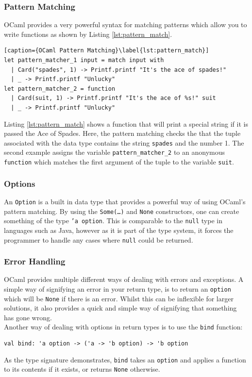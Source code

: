 \documentclass[12pt,a4paper,twoside,openright]{report}
\begin{document}
	\subsubsection*{Pattern Matching}
	OCaml provides a very powerful syntax for matching patterns which allow you to write functions as shown by Listing \ref{lst:pattern_match}.
	\begin{lstlisting}[caption={OCaml Pattern Matching}\label{lst:pattern_match}]
let pattern_matcher_1 input = match input with
  | Card("spades", 1) -> Printf.printf "It's the ace of spades!"
  | _ -> Printf.printf "Unlucky"
let pattern_matcher_2 = function
  | Card(suit, 1) -> Printf.printf "It's the ace of %s!" suit
  | _ -> Printf.printf "Unlucky"
	\end{lstlisting}
	Listing \ref{lst:pattern_match} shows a function that will print a special string if it is passed the Ace of Spades. 
	Here, the pattern matching checks the that the tuple associated with the data type contains the string \texttt{spades} and the number 1.
	The second example assigns the variable \texttt{pattern\_matcher\_2} to an anonymous \texttt{function} which matches the first argument of the tuple to the variable \texttt{suit}.
	\subsubsection*{Options}
	An \texttt{Option} is a built in data type that provides a powerful way of using OCaml's pattern matching.
	By using the \texttt{Some(\ldots)} and \texttt{None} constructors, one can create something of the type \texttt{'a option}. 
	This is comparable to the \texttt{null} type in languages such as Java, however as it is part of the type system, it forces the programmer to handle any cases where \texttt{null} could be returned.

	\subsubsection*{Error Handling}
	OCaml provides multiple different ways of dealing with errors and exceptions. 
	A simple way of signifying an error in your return type, is to return an \texttt{option} which will be \texttt{None} if there is an error. 
	Whilst this can be inflexible for larger solutions, it also provides a quick and simple way of signifying that something has gone wrong.\\

	Another way of dealing with options in return types is to use the \texttt{bind} function:
	\begin{lstlisting}
val bind: 'a option -> ('a -> 'b option) -> 'b option
	\end{lstlisting} 
	As the type signature demonstrates, \texttt{bind} takes an \texttt{option} and applies a function to its contents if it exists, or returns \texttt{None} otherwise.\\
	
\end{document}

